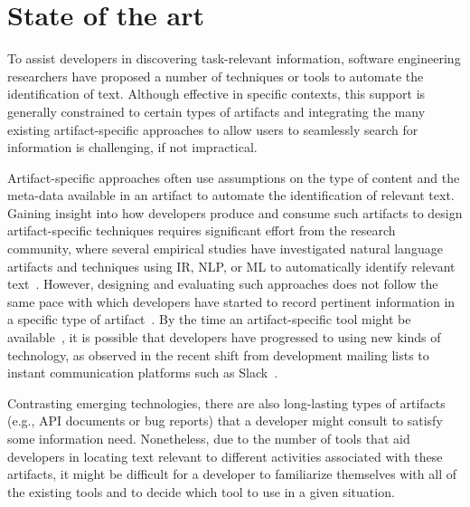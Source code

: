 \section{State of the art}
\label{cp1:novelty}






To assist developers in discovering task-relevant information,
software engineering researchers have proposed 
a number of techniques or tools 
to automate the identification of  text.
Although effective in specific contexts, this support is generally constrained 
to certain
types of artifacts and integrating the many existing artifact-specific
approaches to allow users to seamlessly search for information is challenging, if not impractical. 


Artifact-specific approaches often use assumptions on the type of content 
and the meta-data available in an artifact
to automate the identification of relevant text.
Gaining insight into how developers produce and consume 
such artifacts to design artifact-specific techniques
 requires significant effort from the research community,
 where several empirical studies have investigated 
natural language artifacts 
and techniques using \acf{IR}, \acf{NLP}, or \acf{ML}  to automatically identify
relevant text~\cite{panichella2012, Ko2006, Arya2019, Maalej2013}.
However, designing and evaluating such approaches
does not follow the same pace with which developers have started to 
record pertinent information in a specific type of artifact~\cite{garousi2019}.
By the time an artifact-specific tool might be available~\cite{gibbs1994},
it is possible 
that developers have progressed to using new kinds of technology,
as observed in the recent shift from 
development mailing lists to instant communication platforms such as Slack~\cite{Lin2016, Chatterjee2020}. 




Contrasting emerging technologies, 
there are also
long-lasting types of artifacts (e.g., API documents or bug reports) that a developer
might consult to satisfy some information need. 
Nonetheless, due to the number of tools that aid developers in locating text relevant to different activities associated with these artifacts, it might be difficult for a developer to familiarize themselves 
with all of the existing tools
and to decide which tool to use in a given situation.




